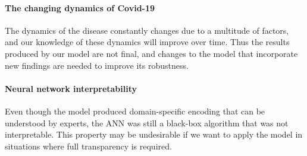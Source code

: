 \paragraph{The changing dynamics of Covid-19}
The dynamics of the disease constantly changes due to a multitude of factors, and our knowledge of these dynamics will improve over time.
Thus the results produced by our model are not final, and changes to the model that incorporate new findings are needed to improve its robustness.

\paragraph{Neural network interpretability}
Even though the model produced domain-specific encoding that can be understood by experts, the \gls{ANN} was still a black-box algorithm that was not interpretable.
This property may be undesirable if we want to apply the model in situations where full transparency is required.
